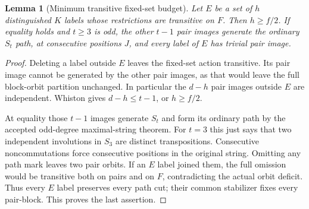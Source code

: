 \documentclass[11pt,a4paper]{article}
\newtheorem{lemma}{Lemma}
\begin{document}
\begin{lemma}[Minimum transitive fixed-set budget]\label{budget}
Let $E$ be a set of $h$ distinguished $K$ labels whose restrictions
are transitive on $F$. Then $h\geq f/2$.
If equality holds and $t\geq3$ is odd, the other $t-1$ pair images
generate the ordinary $S_t$ path, at consecutive positions $J$,
and every label of $E$ has trivial pair image.
\end{lemma}
\begin{proof}
Deleting a label outside $E$ leaves the fixed-set action transitive.
Its pair image cannot be generated by the other pair images, as that
would leave the full block-orbit partition unchanged. In particular
the $d-h$ pair images outside $E$ are independent. Whiston gives
$d-h\leq t-1$, or $h\geq f/2$.

At equality those $t-1$ images generate $S_t$ and form its ordinary
path by the accepted odd-degree maximal-string theorem. For $t=3$
this just says that two independent involutions in $S_3$ are distinct
transpositions. Consecutive noncommutations force consecutive positions
in the original string. Omitting any path mark leaves two pair orbits.
If an $E$ label joined them, the full omission would be transitive both
on pairs and on $F$, contradicting the actual orbit deficit. Thus every
$E$ label preserves every path cut; their common stabilizer fixes every
pair-block. This proves the last assertion.
\end{proof}
\end{document}
